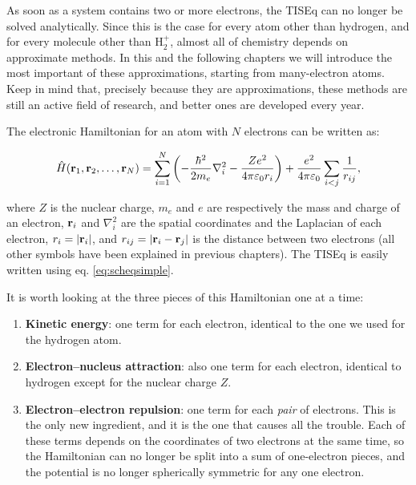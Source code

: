 \documentclass[
  english,
  9pt,
]{extbook}
\providecommand{\tightlist}{%
  \setlength{\itemsep}{0pt}\setlength{\parskip}{0pt}}
\theoremstyle{definition}
\theoremstyle{definition}
\theoremstyle{definition}
\theoremstyle{definition}
\theoremstyle{remark}
\begin{document}
As soon as a system contains two or more electrons, the TISEq can no longer be solved analytically. Since this is the case for every atom other than hydrogen, and for every molecule other than \(\mathrm{H}_2^+\), almost all of chemistry depends on approximate methods. In this and the following chapters we will introduce the most important of these approximations, starting from many-electron atoms. Keep in mind that, precisely because they are approximations, these methods are still an active field of research, and better ones are developed every year.

The electronic Hamiltonian for an atom with \(N\) electrons can be written as:

\begin{equation}
\hat{H}({\bf r}_1,{\bf r}_2,\ldots,{\bf r}_N)=\sum_{i=1}^N \left(-{\frac {\hbar ^{2}}{2m_e }}\nabla_{i}^{2}-{\frac {Ze^{2}}{4\pi \varepsilon _{0}r_{i}}} \right)+{\frac {e^{2}}{4\pi \varepsilon _{0}}}\sum_{i<j}\frac{1}{r_{ij}},
\label{eq:atom1}
\end{equation}

where \(Z\) is the nuclear charge, \(m_e\) and \(e\) are respectively the mass and charge of an electron, \({\bf r}_i\) and \(\nabla_i^2\) are the spatial coordinates and the Laplacian of each electron, \(r_{i}=|{\bf r}_i|\), and \(r_{{ij}}=|{\bf r}_i-{\bf r}_j|\) is the distance between two electrons (all other symbols have been explained in previous chapters). The TISEq is easily written using eq. \eqref{eq:scheqsimple}.

It is worth looking at the three pieces of this Hamiltonian one at a time:

\begin{enumerate}
\def\labelenumi{\arabic{enumi}.}
\tightlist
\item
  \textbf{Kinetic energy}: one term for each electron, identical to the one we used for the hydrogen atom.
\item
  \textbf{Electron--nucleus attraction}: also one term for each electron, identical to hydrogen except for the nuclear charge \(Z\).
\item
  \textbf{Electron--electron repulsion}: one term for each \emph{pair} of electrons. This is the only new ingredient, and it is the one that causes all the trouble. Each of these terms depends on the coordinates of two electrons at the same time, so the Hamiltonian can no longer be split into a sum of one-electron pieces, and the potential is no longer spherically symmetric for any one electron.
\end{enumerate}
\end{document}
